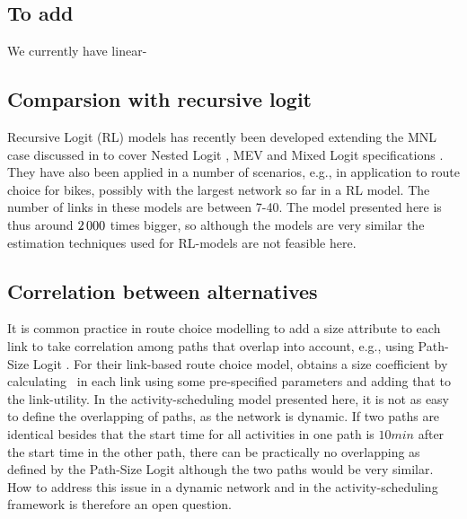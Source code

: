 \subsection{To add}

We currently have linear-


\subsection{Comparsion with recursive logit}
Recursive Logit (RL) models has recently been developed extending the MNL case discussed in \citet{fosgerau2013} to cover Nested Logit \citep{mai2015}, MEV \citep{mai2016method} and Mixed Logit specifications \citep{mai2016decomposition}. They have also been applied in a number of scenarios, e.g., in \cite{zimmermann2017bike}  application to route choice for bikes, possibly with the largest network so far in a RL model. The number of links in these models are between 7-40. The model presented here is thus around $2\, 000$ times bigger, so although the models are very similar the estimation techniques used for RL-models are not feasible here. 

\subsection{Correlation between alternatives}
It is common practice in route choice modelling to add a size attribute to each link to take correlation among paths that overlap into account, e.g., using Path-Size Logit \citep{BenAkivaBier99}. For their link-based route choice model, \citet{fosgerau11} obtains a size coefficient by calculating \eutil\, in each link using some pre-specified parameters and adding that to the link-utility. In the activity-scheduling model presented here, it is not as easy to define the overlapping of paths, as the network is dynamic. If two paths are identical besides that the start time for all activities in one path is $10\unit{min}$ after the start time in the other path, there can be practically no overlapping as defined by the Path-Size Logit although the two paths would be very similar. How to address this issue in a dynamic network and in the activity-scheduling framework is therefore an open question.

